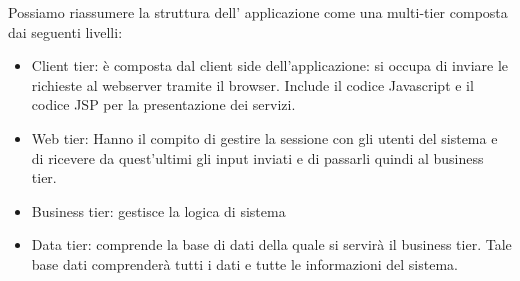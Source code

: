 Possiamo riassumere la struttura dell' applicazione come una multi-tier composta dai seguenti livelli:
\begin{itemize}
\item Client tier: è composta dal client side dell’applicazione: si occupa di inviare le richieste al webserver tramite il browser. Include il codice Javascript e il codice JSP per la presentazione dei servizi.
\item Web tier: Hanno il compito di gestire la sessione con gli utenti del sistema e di ricevere da quest’ultimi gli input inviati e di passarli quindi al business tier.
\item Business tier: gestisce la logica di sistema
\item Data tier: comprende la base di dati della quale si servirà il business tier. Tale base dati comprenderà tutti i dati e tutte le informazioni del sistema.
\end{itemize}

